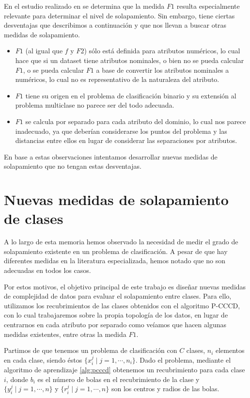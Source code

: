 \documentclass[a4paper,12pt]{report}
\theoremstyle{definition}
\begin{document}
En el estudio realizado en \cite{sanchez2007analysis} se determina que la medida $F1$ resulta especialmente relevante para determinar el nivel de solapamiento.
Sin embargo, tiene ciertas desventajas que describimos a continuación y que nos llevan a buscar otras medidas de solapamiento.
\begin{itemize}
\item $F1$ (al igual que $f$ y $F2$) sólo está definida para atributos numéricos, lo cual hace que si un dataset tiene atributos nominales, o bien no se pueda calcular $F1$, o se pueda calcular $F1$ a base de convertir los atributos nominales a numéricos, lo cual no es representativo de la naturaleza del atributo.
\item $F1$ tiene su origen en el problema de clasificación binario y su extensión al problema multiclase no parece ser del todo adecuada.
\item $F1$ se calcula por separado para cada atributo del dominio, lo cual nos parece inadecuado, ya que deberían considerarse los puntos del problema y las distancias entre ellos en lugar de considerar las separaciones por atributos.
\end{itemize}
En base a estas observaciones intentamos desarrollar nuevas medidas de solapamiento que no tengan estas desventajas.

\chapter{Nuevas medidas de solapamiento de clases}
\label{chp:propuesta}

A lo largo de esta memoria hemos observado la necesidad de medir el grado de solapamiento existente en un problema de clasificación. A pesar de que hay diferentes medidas en la literatura especializada, hemos notado que no son adecuadas en todos los casos.

Por estos motivos, el objetivo principal de este trabajo es diseñar nuevas medidas de complejidad de datos para evaluar el solapamiento entre clases. Para ello, utilizamos los recubrimientos de las clases obtenidos con el algoritmo P-CCCD, con lo cual trabajaremos sobre la propia topología de los datos, en lugar de centrarnos en cada atributo por separado como veíamos que hacen algunas medidas existentes, entre otras la medida $F1$.


Partimos de que tenemos un problema de clasificación con $C$ clases, $n_i$ elementos en cada clase, siendo éstos $\lbrace x_i^j \mid j = 1, \cdots, n_i \rbrace$. Dado el problema, mediante el algoritmo de aprendizaje \ref{alg:pcccd} obtenemos un recubrimiento para cada clase $i$, donde $b_i$ es el número de bolas en el recubrimiento de la clase y $\lbrace y_i^j \mid j = 1, \cdots, n \rbrace$ y $\lbrace r_i^j \mid j = 1, \cdots, n \rbrace$ son los centros y radios de las bolas.
\end{document}
